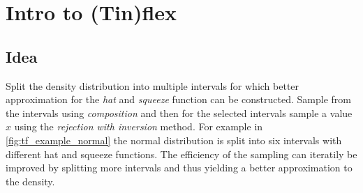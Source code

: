 \section{Intro to (Tin)flex}

\subsection{Idea}

Split the density distribution into multiple intervals for which better approximation for the \textit{hat} and \textit{squeeze} function can be constructed. Sample from the intervals using \textit{composition} and then for the selected intervals sample a value $x$ using the \textit{rejection with inversion} method.
For example in \autoref{fig:tf_example_normal} the normal distribution is split into six intervals with different hat and squeeze functions. The efficiency of the sampling can iteratily be improved by splitting more intervals and thus yielding a better approximation to the density.

